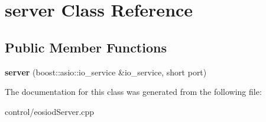 \hypertarget{classserver}{}\section{server Class Reference}
\label{classserver}
\subsection*{Public Member Functions}
\begin{DoxyCompactItemize}
\item 
\mbox{\label{classserver_add3cc1b2c469ccade459882d335e369f}} 
{\bfseries server} (boost\+::asio\+::io\+\_\+service \&io\+\_\+service, short port)
\end{DoxyCompactItemize}


The documentation for this class was generated from the following file\+:\begin{DoxyCompactItemize}
\item 
control/eosiod\+Server.\+cpp\end{DoxyCompactItemize}
